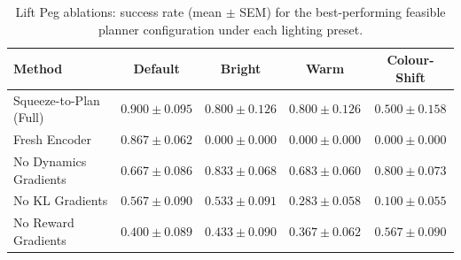 \begin{table}[t]
\centering
\begin{tabular}{lcccc}
\toprule
Method & Default & Bright & Warm & Colour-Shift \\
\midrule
Squeeze-to-Plan (Full) & $0.900 \pm 0.095$ & $0.800 \pm 0.126$ & $0.800 \pm 0.126$ & $0.500 \pm 0.158$ \\
Fresh Encoder & $0.867 \pm 0.062$ & $0.000 \pm 0.000$ & $0.000 \pm 0.000$ & $0.000 \pm 0.000$ \\
No Dynamics Gradients & $0.667 \pm 0.086$ & $0.833 \pm 0.068$ & $0.683 \pm 0.060$ & $0.800 \pm 0.073$ \\
No KL Gradients & $0.567 \pm 0.090$ & $0.533 \pm 0.091$ & $0.283 \pm 0.058$ & $0.100 \pm 0.055$ \\
No Reward Gradients & $0.400 \pm 0.089$ & $0.433 \pm 0.090$ & $0.367 \pm 0.062$ & $0.567 \pm 0.090$ \\
\bottomrule
\end{tabular}
\caption{Lift Peg ablations: success rate (mean $\pm$ SEM) for the best-performing feasible planner configuration under each lighting preset.}
\label{tab:ablations_latency_vs_success_rate}
\end{table}
